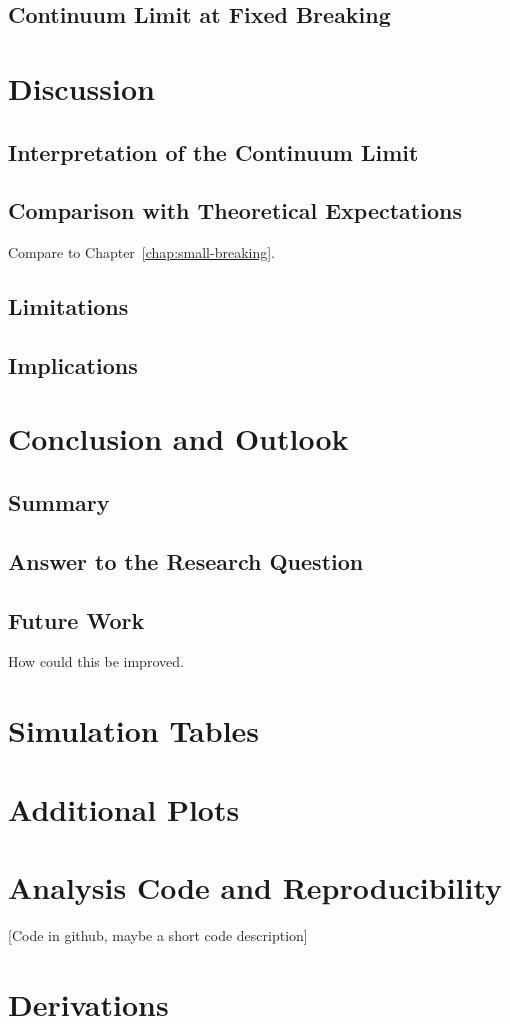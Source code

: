 \documentclass[12pt,a4paper,oneside,numbers=noenddot]{scrreprt}
\begin{document}
\section{Continuum Limit at Fixed Breaking}

\chapter{Discussion}
\label{chap:discussion}
\section{Interpretation of the Continuum Limit}

\section{Comparison with Theoretical Expectations}
Compare to Chapter~\ref{chap:small-breaking}.

\section{Limitations}

\section{Implications}

\chapter{Conclusion and Outlook}
\label{chap:conclusion}
\section{Summary}

\section{Answer to the Research Question}

\section{Future Work}
How could this be improved.

\appendix

\chapter{Simulation Tables}

\chapter{Additional Plots}

\chapter{Analysis Code and Reproducibility}
[Code in github, maybe a short code description]

\chapter{Derivations}



\end{document}
